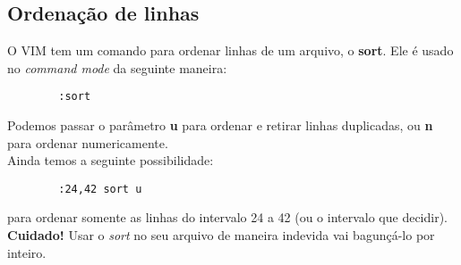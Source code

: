 \documentclass[12pt]{article}
\begin{document}
	\subsection{Ordenação de linhas}
	O VIM tem um comando para ordenar linhas de um arquivo, o \textbf{sort}. Ele é usado no \emph{command mode} da seguinte maneira:
	\begin{lstlisting}
		:sort 
	\end{lstlisting}
	Podemos passar o parâmetro \textbf{u} para ordenar e retirar linhas duplicadas, ou \textbf{n} para ordenar numericamente. \\
	Ainda temos a seguinte possibilidade:
	\begin{lstlisting}
		:24,42 sort u
	\end{lstlisting}
	para ordenar somente as linhas do intervalo 24 a 42 (ou o intervalo que decidir). \\
	\textbf{Cuidado!} Usar o \emph{sort} no seu arquivo de maneira indevida vai bagunçá-lo por inteiro.
\end{document}
